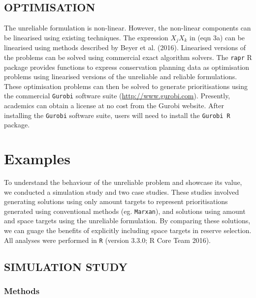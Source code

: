 \documentclass[11pt,]{article}
\begin{document}
\subsection{OPTIMISATION}\label{optimisation}

The unreliable formulation is non-linear. However, the non-linear
components can be linearised using existing techniques. The expression
$X_j X_k$ in (eqn 3a) can be linearised using methods described by Beyer
et al. (2016). Linearised versions of the problems can be solved using
commercial exact algorithm solvers. The \texttt{rapr} R package provides
functions to express conservation planning data as optimisation problems
using linearised versions of the unreliable and reliable formulations.
These optimisation problems can then be solved to generate
prioritisations using the commercial \texttt{Gurobi} software suite
(\url{http://www.gurobi.com}). Presently, academics can obtain a license
at no cost from the Gurobi website. After installing the \texttt{Gurobi}
software suite, users will need to install the \texttt{Gurobi R}
package.

\section{Examples}\label{examples}

To understand the behaviour of the unreliable problem and showcase its
value, we conducted a simulation study and two case studies. These
studies involved generating solutions using only amount targets to
represent prioritisations generated using conventional methods (eg.
\texttt{Marxan}), and solutions using amount and space targets using the
unreliable formulation. By comparing these solutions, we can guage the
benefits of explicitly including space targets in reserve selection. All
analyses were performed in \texttt{R} (version 3.3.0; {R Core Team}
2016).

\subsection{SIMULATION STUDY}\label{simulation-study}

\subsubsection{Methods}\label{methods-1}
\end{document}
